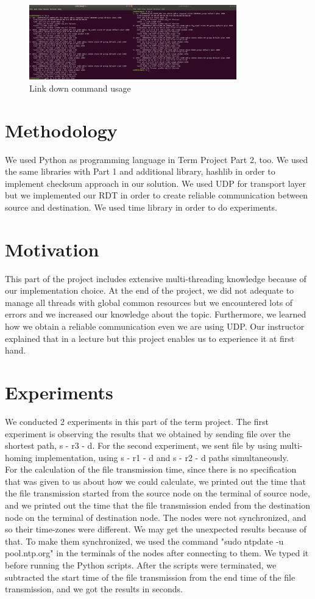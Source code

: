 \documentclass[conference]{IEEEtran}
\begin{document}
\begin{figure}[htp]
    \centering
    \includegraphics[width=9cm]{link_down.png}
    \caption{Link down command usage}
    \label{fig:graph}
\end{figure}

\section{Methodology}
We used Python as programming language in Term Project Part 2, too. We used the same libraries with Part 1 and additional library, hashlib in order to implement checksum approach in our solution. We used UDP for transport layer but we implemented our RDT in order to create reliable communication between source and destination. We used time library in order to do experiments.
\section{Motivation}
This part of the project includes extensive multi-threading knowledge because of our implementation choice. At the end of the project, we did not adequate to manage all threads with global common resources but we encountered lots of errors and we increased our knowledge about the topic. Furthermore, we learned how we obtain a reliable communication even we are using UDP. Our instructor explained that in a lecture but this project enables us to experience it at first hand.
\section{Experiments}
We conducted 2 experiments in this part of the term project. The first experiment is observing the results that we obtained by sending file over the shortest path, s - r3 - d. For the second experiment, we sent file by using multi-homing implementation, using s - r1 - d and s - r2 - d paths simultaneously. \\

For the calculation of the file transmission time, since there is no specification that was given to us about how we could calculate, we printed out the time that the file transmission started from the source node on the terminal of source node, and we printed out the time that the file transmission ended from the destination node on the terminal of destination node. The nodes were not synchronized, and so their time-zones were different. We may get the unexpected results because of that. To make them synchronized, we used the command "sudo ntpdate -u pool.ntp.org" in the terminals of the nodes after connecting to them. We typed it before running the Python scripts. After the scripts were terminated, we subtracted the start time of the file transmission from the end time of the file transmission, and we got the results in seconds. \\
\end{document}
